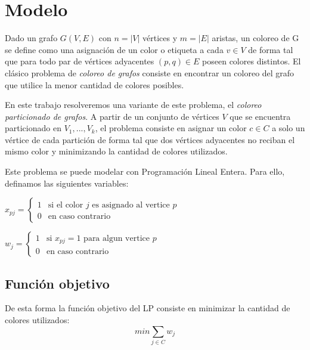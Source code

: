 \section{Modelo}

Dado un grafo $G(V,E)$ con $n = |V|$ vértices y $m = |E|$ aristas,  un coloreo de G se define como una asignación de un color o etiqueta a cada $v \in V$ de forma tal que para todo  par de vértices adyacentes $(p,q) \in E$ poseen colores distintos. El clásico problema de \textit{coloreo de grafos} consiste en encontrar un coloreo del grafo que utilice la menor cantidad de colores posibles.

En este trabajo resolveremos una variante de este problema, el \textit{coloreo particionado de grafos}. A partir de un conjunto de vértices $V$ que se encuentra particionado en $V_1,...,V_k$, el problema consiste en asignar un color $c \in C$ a solo un vértice de cada partición de forma tal que dos vértices adyacentes no reciban el mismo color y minimizando la cantidad de colores utilizados.

Este problema se puede modelar con Programación Lineal Entera. Para ello, definamos las siguientes variables:

\hspace{1px}

\begin{center}
$x_{pj} = \begin{cases}
  1 & \text{si el color $j$ es asignado al vertice $p$} \\
  0 & \text{en caso contrario}
\end{cases}$

\hspace{1px}

$w_j = \begin{cases}
  1 & \text{si $x_{pj} = 1$ para algun vertice $p$} \\
  0 & \text{en caso contrario}
\end{cases}$
\end{center}

\subsection{Función objetivo}

De esta forma la función objetivo del LP consiste en minimizar la cantidad de colores utilizados:
\begin{equation}
min \sum_{j \in C} w_j
\end{equation}

